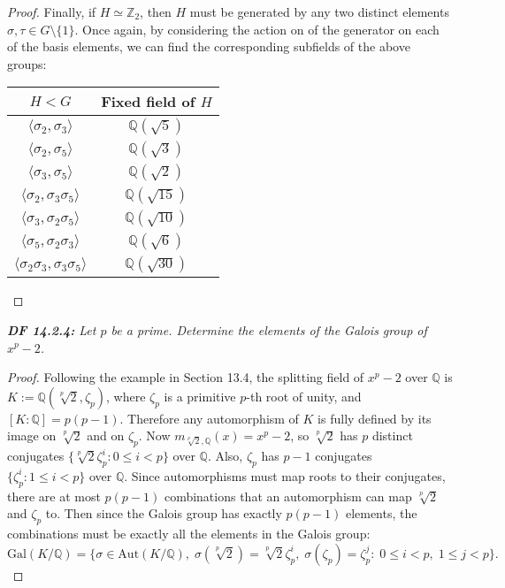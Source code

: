 \documentclass{article}
\begin{document}
\begin{proof}
    Finally, if $H\simeq\mathbb{Z}_2$, then $H$ must be generated by any
    two distinct elements $\sigma,\tau\in G\setminus\{1\}$. Once again, by
    considering the action on of the generator on each of the basis
    elements, we can find the corresponding subfields of the above groups:
    \begin{table}[h]
      \centering
      \begin{tabular}{c|c}
        $H<G$ & Fixed field of $H$ \\
        \hline
        $\langle \sigma_2,\sigma_3\rangle$ &$\mathbb{Q}(\sqrt{5})$\\
        $\langle \sigma_2,\sigma_5\rangle$ &$\mathbb{Q}(\sqrt{3})$\\
        $\langle \sigma_3,\sigma_5\rangle$ &$\mathbb{Q}(\sqrt{2})$\\
        $\langle \sigma_2,\sigma_3\sigma_5\rangle$ &$\mathbb{Q}(\sqrt{15})$\\
        $\langle \sigma_3,\sigma_2\sigma_5\rangle$ &$\mathbb{Q}(\sqrt{10})$\\
        $\langle \sigma_5,\sigma_2\sigma_3\rangle$ &$\mathbb{Q}(\sqrt{6})$\\
        $\langle \sigma_2\sigma_3,\sigma_3\sigma_5\rangle$
          &$\mathbb{Q}(\sqrt{30})$\\
      \end{tabular}
    \end{table}
  \end{proof}

\it \textbf{DF 14.2.4:} Let $p$ be a prime. Determine the elements of the
  Galois group of $x^p-2$.

  \begin{proof}
    Following the example in Section 13.4, the splitting field of $x^p-2$
    over $\mathbb{Q}$ is $K:=\mathbb{Q}(\sqrt[p]{2},\zeta_p)$, where
    $\zeta_p$ is a primitive $p$-th root of unity, and
    $[K:\mathbb{Q}]=p(p-1)$. Therefore any automorphism of $K$ is fully
    defined by its image on $\sqrt[p]{2}$ and on $\zeta_p$. Now
    $m_{\sqrt[p]{2},\mathbb{Q}}(x)=x^p-2$, so $\sqrt[p]{2}$ has $p$
    distinct conjugates $\{\sqrt[p]{2}\zeta^i_p:0\leq i<p\}$ over
    $\mathbb{Q}$. Also, $\zeta_p$ has $p-1$ conjugates $\{\zeta_p^i:1\leq
    i<p\}$ over $\mathbb{Q}$. Since automorphisms must map roots to their
    conjugates, there are at most $p(p-1)$ combinations that an
    automorphism can map $\sqrt[p]{2}$ and $\zeta_p$ to. Then since
    the Galois group has exactly $p(p-1)$ elements, the combinations must
    be exactly all the elements in the Galois group:
    \[\text{Gal}(K/\mathbb{Q}) =\{\sigma\in\text{Aut}(K/\mathbb{Q}),\;
    \sigma(\sqrt[p]{2})=\sqrt[p]{2}\zeta^i_p,\;
    \sigma(\zeta_p)=\zeta_p^j:\; 0\leq i<p,\; 1\leq j<p\}.\]
  \end{proof}
\end{document}

